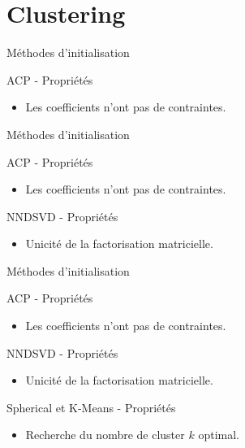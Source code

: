 \documentclass{beamer}
\begin{document}

\section{Clustering}

\begin{frame}{Méthodes d'initialisation}

\begin{block}{ACP - Propriétés}
\begin{itemize}
  \item Les coefficients n'ont pas de contraintes.
\end{itemize}
\end{block}

\end{frame}

\begin{frame}{Méthodes d'initialisation}

\begin{block}{ACP - Propriétés}
\begin{itemize}
  \item Les coefficients n'ont pas de contraintes.
\end{itemize}
\end{block}

\begin{block}{NNDSVD - Propriétés}
\begin{itemize}
\item Unicité de la factorisation matricielle.
\end{itemize}
\end{block}


\end{frame}

\begin{frame}{Méthodes d'initialisation}
\begin{block}{ACP - Propriétés}
\begin{itemize}
  \item Les coefficients n'ont pas de contraintes.
\end{itemize}
\end{block}

\begin{block}{NNDSVD - Propriétés}
\begin{itemize}
\item Unicité de la factorisation matricielle.
\end{itemize}
\end{block}

\begin{block}{Spherical et K-Means - Propriétés}
\begin{itemize}
\item Recherche du nombre de cluster $k$ optimal.
\end{itemize}
\end{block}
\end{frame}
\end{document}
